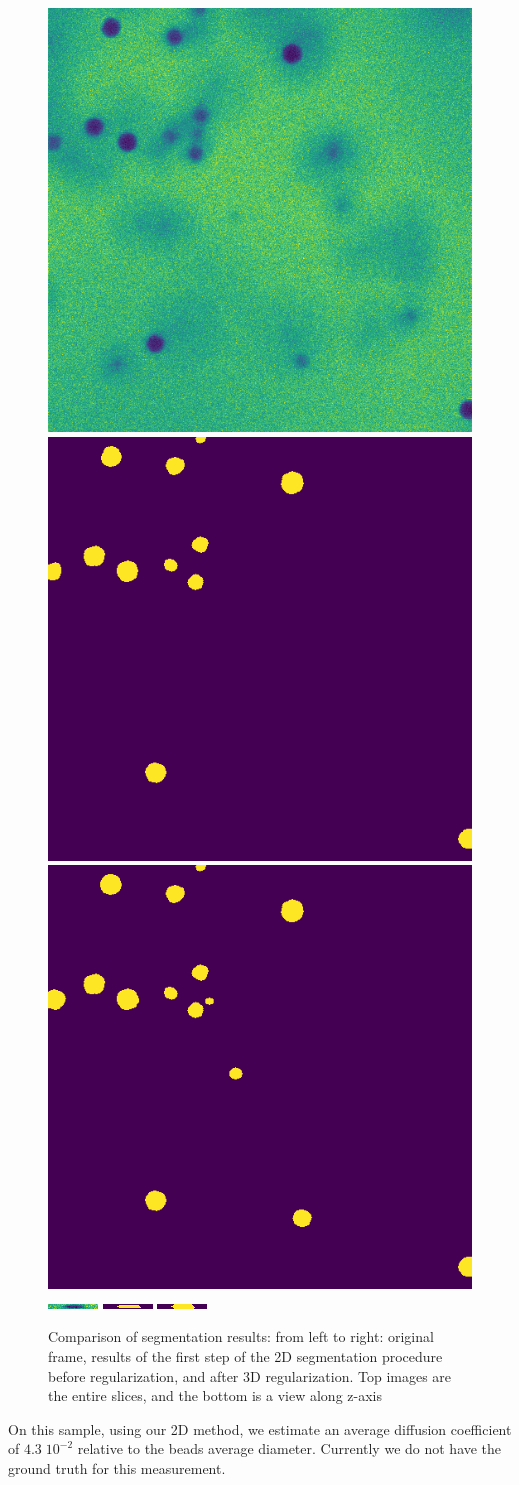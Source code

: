 \documentclass{llncs}
\begin{document}
\begin{figure}
\centering
\includegraphics[width = 0.3\linewidth]{images/orig_tot.png}
\includegraphics[width = 0.3\linewidth]{images/seg_base_tot.png}
\includegraphics[width = 0.3\linewidth]{images/modif_tot.png}\\
\vspace{0.3em}
\includegraphics[width = 0.3\linewidth]{images/orig.png}
\includegraphics[width = 0.3\linewidth]{images/seg_base.png}
\includegraphics[width = 0.3\linewidth]{images/modif.png}\\
\caption{Comparison of segmentation results: from left to right: original frame, results of the first step of the 2D segmentation procedure before regularization, and after 3D regularization. Top images are the entire slices, and the bottom is a view along z-axis}
\label{fig:compa}
\end{figure}

On this sample, using our 2D method, we estimate an average diffusion coefficient of $4.3\;10^{-2}$ relative to the beads average diameter. Currently we do not have the ground truth for this measurement. 
\end{document}
